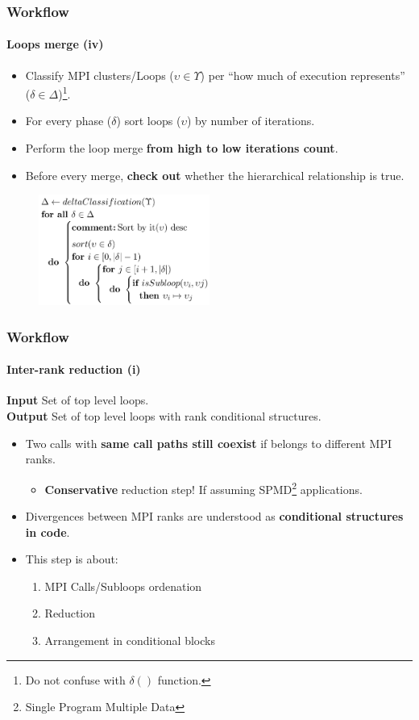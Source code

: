 \documentclass{beamer}
\begin{document}
\begin{frame}
\frametitle{Workflow}
\framesubtitle{Loops merge (iv)}
\begin{itemize}
	\item Classify MPI clusters/Loops ($\upsilon \in \Upsilon$) per ``how much of execution represents'' ($\delta \in \Delta$)\footnote{Do not confuse with $\delta()$ function.}.
	\item For every phase ($\delta$) sort loops ($\upsilon$) by number of iterations.
	\item Perform the loop merge \textbf{from high to low iterations count}.
	\item Before every merge, \textbf{check out} whether the hierarchical relationship is true.
\end{itemize}
\begin{figure}
	\includegraphics[width=0.5\textwidth]{imgs/loops_merge_pseudocode.png}
\end{figure}
\end{frame}

\begin{frame}
\frametitle{Workflow}
\framesubtitle{Inter-rank reduction (i)}
\textbf{Input} Set of top level loops.\\
\textbf{Output} Set of top level loops with rank conditional structures.\\
\vspace{10px}
\pause
\begin{itemize}
	\item Two calls with \textbf{same call paths still coexist} if belongs to different MPI ranks.
	\begin{itemize}
		\item \textbf{Conservative} reduction step! If assuming SPMD\footnote{Single Program Multiple Data} applications.
	\end{itemize}
	\item Divergences between MPI ranks are understood as \textbf{conditional structures in code}.
	\item This step is about: 
	\begin{enumerate}
		\item MPI Calls/Subloops ordenation
		\item Reduction
		\item Arrangement in conditional blocks
	\end{enumerate}

\end{itemize}
\end{frame}
\end{document}
